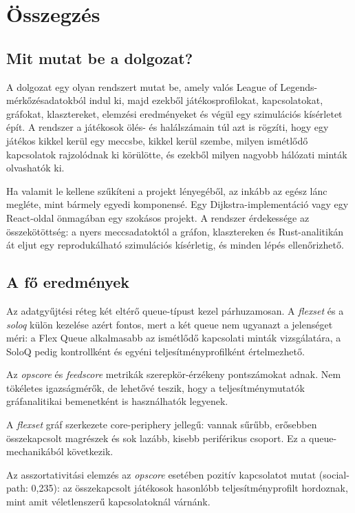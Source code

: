 \chapter{Összegzés}

\section{Mit mutat be a dolgozat?}

A dolgozat egy olyan rendszert mutat be, amely valós League of Legends-mérkőzésadatokból indul ki, majd ezekből játékosprofilokat, kapcsolatokat, gráfokat, klasztereket, elemzési eredményeket és végül egy szimulációs kísérletet épít. A rendszer a játékosok ölés- és halálszámain túl azt is rögzíti, hogy egy játékos kikkel kerül egy meccsbe, kikkel kerül szembe, milyen ismétlődő kapcsolatok rajzolódnak ki körülötte, és ezekből milyen nagyobb hálózati minták olvashatók ki.

Ha valamit le kellene szűkíteni a projekt lényegéből, az inkább az egész lánc megléte, mint bármely egyedi komponensé. Egy Dijkstra-implementáció vagy egy React-oldal önmagában egy szokásos projekt. A rendszer érdekessége az összekötöttség: a nyers meccsadatoktól a gráfon, klasztereken és Rust-analitikán át eljut egy reprodukálható szimulációs kísérletig, és minden lépés ellenőrizhető.

\section{A fő eredmények}

Az adatgyűjtési réteg két eltérő queue-típust kezel párhuzamosan. A \textit{flexset} és a \textit{soloq} külön kezelése azért fontos, mert a két queue nem ugyanazt a jelenséget méri: a Flex Queue alkalmasabb az ismétlődő kapcsolati minták vizsgálatára, a SoloQ pedig kontrollként és egyéni teljesítményprofilként értelmezhető.

Az \textit{opscore} és \textit{feedscore} metrikák szerepkör-érzékeny pontszámokat adnak. Nem tökéletes igazságmérők, de lehetővé teszik, hogy a teljesítménymutatók gráfanalitikai bemenetként is használhatók legyenek.

A \textit{flexset} gráf szerkezete core-periphery jellegű: vannak sűrűbb, erősebben összekapcsolt magrészek és sok lazább, kisebb periférikus csoport. Ez a queue-mechanikából következik.

Az asszortativitási elemzés az \textit{opscore} esetében pozitív kapcsolatot mutat (social-path: 0,235): az összekapcsolt játékosok hasonlóbb teljesítményprofilt hordoznak, mint amit véletlenszerű kapcsolatoknál várnánk.

